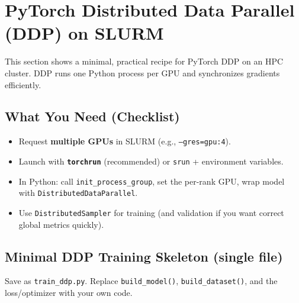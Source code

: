 \documentclass[11pt]{article}
\begin{document}
\section{PyTorch Distributed Data Parallel (DDP) on SLURM}
\label{sec:ddp}

This section shows a minimal, practical recipe for PyTorch DDP on an HPC cluster.
DDP runs one Python process per GPU and synchronizes gradients efficiently.

\subsection{What You Need (Checklist)}
\begin{itemize}[leftmargin=*]
  \item Request \textbf{multiple GPUs} in SLURM (e.g., \texttt{--gres=gpu:4}).
  \item Launch with \textbf{\texttt{torchrun}} (recommended) or \texttt{srun} + environment variables.
  \item In Python: call \texttt{init\_process\_group}, set the per-rank GPU, wrap model with \texttt{DistributedDataParallel}.
  \item Use \texttt{DistributedSampler} for training (and validation if you want correct global metrics quickly).
\end{itemize}

\subsection{Minimal DDP Training Skeleton (single file)}
Save as \texttt{train\_ddp.py}. Replace \texttt{build\_model()}, \texttt{build\_dataset()}, and the loss/optimizer with your own code.
\end{document}
